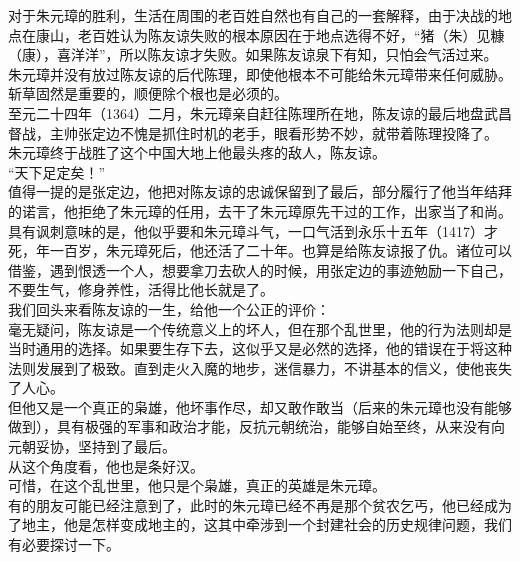 \begin{multicols}{\theparacolNo}
对于朱元璋的胜利，生活在周围的老百姓自然也有自己的一套解释，由于决战的地点在康山，老百姓认为陈友谅失败的根本原因在于地点选得不好，“猪（朱）见糠（康），喜洋洋”，所以陈友谅才失败。如果陈友谅泉下有知，只怕会气活过来。\\

朱元璋并没有放过陈友谅的后代陈理，即使他根本不可能给朱元璋带来任何威胁。斩草固然是重要的，顺便除个根也是必须的。\\

至元二十四年（1364）二月，朱元璋亲自赶往陈理所在地，陈友谅的最后地盘武昌督战，主帅张定边不愧是抓住时机的老手，眼看形势不妙，就带着陈理投降了。\\

朱元璋终于战胜了这个中国大地上他最头疼的敌人，陈友谅。\\

“天下足定矣！”\\

值得一提的是张定边，他把对陈友谅的忠诚保留到了最后，部分履行了他当年结拜的诺言，他拒绝了朱元璋的任用，去干了朱元璋原先干过的工作，出家当了和尚。\\

具有讽刺意味的是，他似乎要和朱元璋斗气，一口气活到永乐十五年（1417）才死，年一百岁，朱元璋死后，他还活了二十年。也算是给陈友谅报了仇。诸位可以借鉴，遇到恨透一个人，想要拿刀去砍人的时候，用张定边的事迹勉励一下自己，不要生气，修身养性，活得比他长就是了。\\

我们回头来看陈友谅的一生，给他一个公正的评价：\\

毫无疑问，陈友谅是一个传统意义上的坏人，但在那个乱世里，他的行为法则却是当时通用的选择。如果要生存下去，这似乎又是必然的选择，他的错误在于将这种法则发展到了极致。直到走火入魔的地步，迷信暴力，不讲基本的信义，使他丧失了人心。\\

但他又是一个真正的枭雄，他坏事作尽，却又敢作敢当（后来的朱元璋也没有能够做到），具有极强的军事和政治才能，反抗元朝统治，能够自始至终，从来没有向元朝妥协，坚持到了最后。\\

从这个角度看，他也是条好汉。\\

可惜，在这个乱世里，他只是个枭雄，真正的英雄是朱元璋。\\

有的朋友可能已经注意到了，此时的朱元璋已经不再是那个贫农乞丐，他已经成为了地主，他是怎样变成地主的，这其中牵涉到一个封建社会的历史规律问题，我们有必要探讨一下。\\


\end{multicols}
